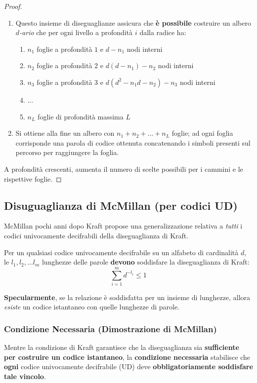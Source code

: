 \begin{proof}
\begin{enumerate}[label=\textbf{Passo \arabic*.}]
    \item Questo insieme di diseguaglianze assicura che \textbf{è possibile} costruire un albero \textit{$d$-ario} che per ogni livello a profondità $i$ dalla radice ha:
    \begin{enumerate}
        \item $n_1$ foglie a profondità $1$ e $d-n_1$ nodi interni
        \item $n_2$ foglie a profondità $2$ e $d(d-n_1)-n_2$ nodi interni
        \item $n_3$ foglie a profondità $3$ e $d(d^2-n_1d-n_2)-n_3$ nodi interni
        \item $\dots$
        \item $n_L$ foglie di profondità massima $L$
    \end{enumerate}

     \item Si ottiene alla fine un albero con $n_1 + n_2 + \dots + n_L$ foglie; ad ogni foglia corrisponde una parola di codice ottenuta concatenando i simboli presenti sul percorso per raggiungere la foglia.
\end{enumerate}
A profondità crescenti, aumenta il numero di scelte possibili per i cammini e le rispettive foglie.

\end{proof}


\subsection{Disuguaglianza di McMillan (per codici UD)}
McMillan pochi anni dopo Kraft propose una generalizzazione relativa a \textit{tutti} i codici univocamente decifrabili della diseguaglianza di Kraft.
\begin{theorem}
    Per un qualsiasi codice univocamente decifrabile su un alfabeto di cardinalità $d$, le $l_1,l_2,\dots l_m$ lunghezze delle parole \textbf{devono} soddisfare la diseguaglianza di Kraft:
    \[\sum_{i=1}^m d^{-l_i} \leq 1\]
\end{theorem}
\textbf{Specularmente}, se la relazione è soddisfatta per un insieme di lunghezze, allora \textit{esiste} un codice istantaneo con quelle lunghezze di parole.

\subsubsection{Condizione Necessaria (Dimostrazione di McMillan)}
Mentre la condizione di Kraft garantisce che la diseguaglianza sia \textbf{sufficiente per costruire un codice istantaneo}, la \textbf{condizione necessaria} stabilisce che \textbf{ogni} codice univocamente decifrabile (UD) deve \textbf{obbligatoriamente soddisfare tale vincolo}.

